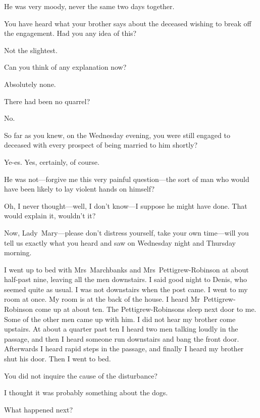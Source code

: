 \begin{dialogue}
 He was very moody, never the same two days together.

 You have heard what your brother says about the deceased wishing to break off the engagement. Had you any idea of this?

 Not the slightest.

 Can you think of any explanation now?

 Absolutely none.

 There had been no quarrel?

 No.

 So far as you knew, on the Wednesday evening, you were still engaged to deceased with every prospect of being married to him shortly?

 Ye-es. Yes, certainly, of course.

 He was not—forgive me this very painful question—the sort of man who would have been likely to lay violent hands on himself?

 Oh, I never thought—well, I don't know—I suppose he might have done. That would explain it, wouldn't it?

 Now, Lady~Mary—please don't distress yourself, take your own time—will you tell us exactly what you heard and saw on Wednesday night and Thursday morning.

 I went up to bed with Mrs~Marchbanks and Mrs~Pettigrew-Robinson at about half-past nine, leaving all the men downstairs. I said good night to Denis, who seemed quite as usual. I was not downstairs when the post came. I went to my room at once. My room is at the back of the house. I heard Mr~Pettigrew-Robinson come up at about ten. The Pettigrew-Robinsons sleep next door to me. Some of the other men came up with him. I did not hear my brother come upstairs. At about a quarter past ten I heard two men talking loudly in the passage, and then I heard someone run downstairs and bang the front door. Afterwards I heard rapid steps in the passage, and finally I heard my brother shut his door. Then I went to bed.

 You did not inquire the cause of the disturbance?

  I thought it was probably something about the dogs.

 What happened next?


\end{dialogue}
